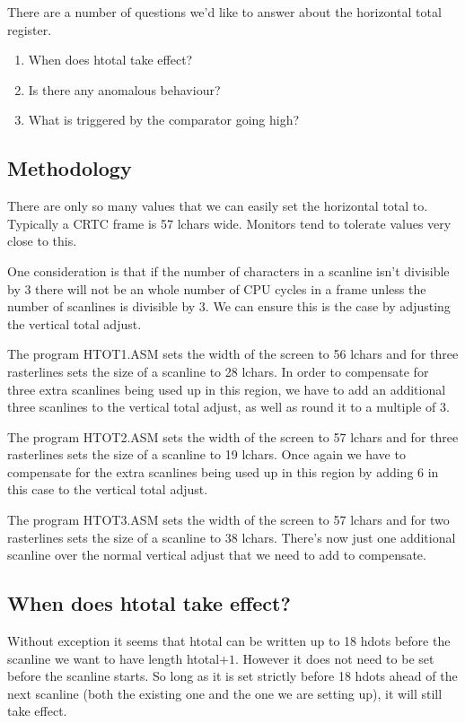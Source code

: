 \documentclass[a4paper,10pt]{amsart}
\begin{document}
There are a number of questions we'd like to answer about the horizontal total
register.

\begin{enumerate}
\item When does htotal take effect?
\item Is there any anomalous behaviour?
\item What is triggered by the comparator going high?
\end{enumerate}

\subsection{Methodology}

There are only so many values that we can easily set the horizontal total to.
Typically a CRTC frame is 57 lchars wide. Monitors tend to tolerate values
very close to this.

One consideration is that if the number of characters in a scanline isn't
divisible by 3 there will not be an whole number of CPU cycles in a frame
unless the number of scanlines is divisible by 3. We can ensure this is the
case by adjusting the vertical total adjust.

The program HTOT1.ASM sets the width of the screen to 56 lchars and for three
rasterlines sets the size of a scanline to 28 lchars. In order to compensate
for three extra scanlines being used up in this region, we have to add an
additional three scanlines to the vertical total adjust, as well as round it
to a multiple of 3.

The program HTOT2.ASM sets the width of the screen to 57 lchars and for three
rasterlines sets the size of a scanline to 19 lchars. Once again we have to
compensate for the extra scanlines being used up in this region by adding
6 in this case to the vertical total adjust.

The program HTOT3.ASM sets the width of the screen to 57 lchars and for two
rasterlines sets the size of a scanline to 38 lchars. There's now just one
additional scanline over the normal vertical adjust that we need to add to
compensate.

\subsection{When does htotal take effect?}

Without exception it seems that htotal can be written up to 18 hdots before the
scanline we want to have length htotal$+1$. However it does not need to be set
before the scanline starts. So long as it is set strictly before 18 hdots ahead
of the next scanline (both the existing one and the one we are setting up), it
will still take effect.
\end{document}
